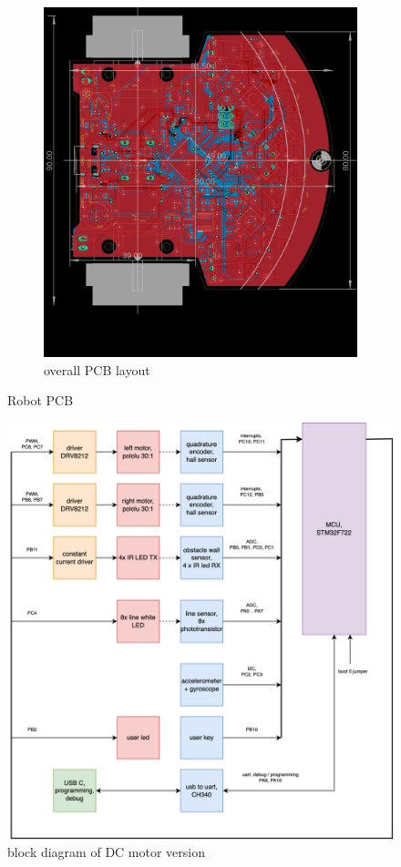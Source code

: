 \documentclass[12pt,twoside,onecolumn,openany,extrafontsizes,dvipsnames]{memoir}
\begin{document}
\begin{figure}[h]
\begin{subfigure}{.5\textwidth}
        \includegraphics[scale=0.35]{../images/board_all.png}
        \caption{overall PCB layout}
        \label{fig:overall_PCB_layout}
    \end{subfigure}
    
    \caption{Robot PCB}
\end{figure}

\newpage
\begin{figure}[h]
    \centering
    \includegraphics[scale=0.8]{../diagrams/diagrams-block_dc.png}
    \caption{block diagram of DC motor version}
\end{figure}
\end{document}
